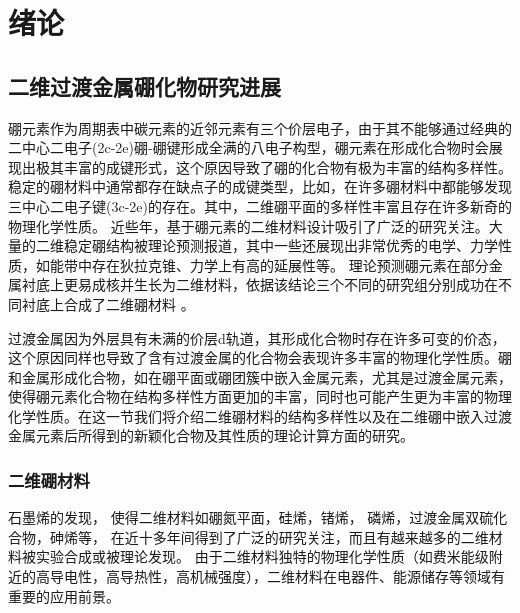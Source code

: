 \chapter{绪论}\label{chapter_introduction}

\section{二维过渡金属硼化物研究进展}

硼元素作为周期表中碳元素的近邻元素有三个价层电子，由于其不能够通过经典的二中心二电子(2c-2e)硼-硼键形成全满的八电子构型，硼元素在形成化合物时会展现出极其丰富的成键形式，这个原因导致了硼的化合物有极为丰富的结构多样性。
稳定的硼材料中通常都存在缺点子的成键类型，比如，在许多硼材料中都能够发现三中心二电子键(3c-2e)的存在。其中，二维硼平面的多样性丰富且存在许多新奇的物理化学性质。
近些年，基于硼元素的二维材料设计吸引了广泛的研究关注。大量的二维稳定硼结构被理论预测报道，其中一些还展现出非常优秀的电学、力学性质，如能带中存在狄拉克锥、力学上有高的延展性等。
理论预测硼元素在部分金属衬底上更易成核并生长为二维材料\cite{liu2013probing,liu2013boron,zhang2015two}，依据该结论三个不同的研究组分别成功在不同衬底上合成了二维硼材料\cite{mannix2015synthesis,zhong2017metastable,zhong2017synthesis,li2018experimental,feng2016experimental} 。

过渡金属因为外层具有未满的价层d轨道，其形成化合物时存在许多可变的价态，这个原因同样也导致了含有过渡金属的化合物会表现许多丰富的物理化学性质。硼和金属形成化合物，如在硼平面或硼团簇中嵌入金属元素，尤其是过渡金属元素，使得硼元素化合物在结构多样性方面更加的丰富，同时也可能产生更为丰富的物理化学性质。在这一节我们将介绍二维硼材料的结构多样性以及在二维硼中嵌入过渡金属元素后所得到的新颖化合物及其性质的理论计算方面的研究。

\subsection{二维硼材料}
石墨烯\cite{novoselov2005two, zhang2005experimental, ferrari2006raman,yan2012first, lu2009tuning}的发现，
使得二维材料如硼氮平面\cite{watanabe2004direct}，硅烯\cite{liu2014comparison, molle2018silicene, li2018stable}，锗烯\cite{liu2015multiple}，
磷烯\cite{hu2018strong}，过渡金属双硫化合物\cite{cai2014constructing, wang2012electronics, pei2015exciton}，砷烯\cite{zhang2015atomically}等，
在近十多年间得到了广泛的研究关注，而且有越来越多的二维材料被实验合成或被理论发现。
由于二维材料独特的物理化学性质（如费米能级附近的高导电性，高导热性，高机械强度），二维材料在电器件、能源储存等领域有重要的应用前景。

